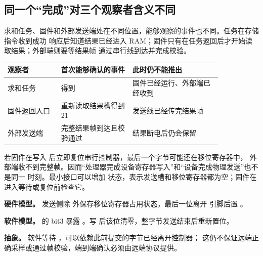 \subsection{同一个“完成”对三个观察者含义不同}

求和任务、固件和外部发送端处在不同位置，能够观察的事件也不同。任务在存储指令收到成功
响应后知道结果已经进入 RAM；固件只有在任务返回后才开始读取结果；外部端则要等结果帧
通过串行线到达并完成校验。

\begin{longtable}{|L{0.21\linewidth}|L{0.28\linewidth}|L{0.35\linewidth}|}
\hline
观察者 & 首次能够确认的事件 & 此时仍不能推出 \\ \hline
求和任务 &  得到  & 固件已经运行、外部端已经收到 \\ \hline
固件返回入口 & 重新读取结果槽得到 21 & 发送线已经传完结果帧 \\ \hline
外部发送端 & 完整结果帧到达且校验通过 & 结果断电后仍会保留 \\ \hline
\end{longtable}

若固件在写入  后立即复位串行控制器，最后一个字节可能还在移位寄存器中，
外部端收不到完整帧。因而“处理器完成设备寄存器写入”和“设备完成物理发送”也不是同一
时刻。最小接口可以增加  状态，表示发送槽和移位寄存器都为空；固件在
进入等待或复位前检查它。

\textbf{硬件模型。} 发送侧除  外保存移位寄存器占用状态，最后一位离开
引脚后置 。

\textbf{软件模型。}  的 bit3 暴露 。写
 后该位清零，整字节发送结束后重新置位。

\textbf{抽象。} 软件等待 ，可以依赖此前提交的字节已经离开控制器；
这仍不保证远端正确采样或通过帧校验，端到端确认必须由远端协议提供。

\begin{center}
\end{center}

